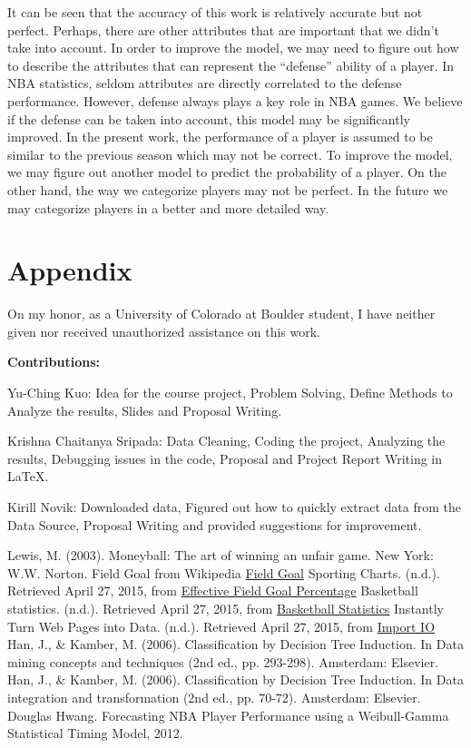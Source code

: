 \documentclass{acm_proc_article-sp}
\begin{document}
It can be seen that the accuracy of this work is relatively accurate but not perfect. Perhaps, there are other attributes that are important that we didn't take into account. In order to improve the model, we may need to figure out how to describe the attributes that can represent the ``defense'' ability of a player. In NBA statistics, seldom attributes are directly correlated to the defense performance. However, defense always plays a key role in NBA games. We believe if the defense can be taken into account, this model may be significantly improved.
In the present work, the performance of a player is assumed to be similar to the previous season which may not be correct. To improve the model, we may figure out another model to predict the probability of a player. On the other hand, the way we categorize players may not be perfect. In the future we may categorize players in a better and more detailed way. 

\section{Appendix}
\vspace{0.5em}
On my honor, as a University of Colorado at Boulder student, I have neither given nor received unauthorized assistance on this work.

\textbf{Contributions:}

Yu-Ching Kuo: Idea for the course project, Problem Solving, Define Methods to Analyze the results, Slides and Proposal Writing.

Krishna Chaitanya Sripada: Data Cleaning, Coding the project, Analyzing the results, Debugging issues in the code, Proposal and Project Report Writing in LaTeX.

Kirill Novik: Downloaded data, Figured out how to quickly extract data from the Data Source, Proposal Writing and provided suggestions for improvement.

\begin{thebibliography}{}
\vspace{0.5em}
Lewis, M. (2003). Moneyball: The art of winning an unfair game. New York: W.W. Norton.
 Field Goal from Wikipedia \href{http://en.wikipedia.org/wiki/Field_goal}{Field Goal}
 Sporting Charts. (n.d.). Retrieved April 27, 2015, from \href{http://www.sportingcharts.com/dictionary/nba/effective-field-goal-percentage-efg.aspx}{Effective Field Goal Percentage}
 Basketball statistics. (n.d.). Retrieved April 27, 2015, from \href{http://en.wikipedia.org/wiki/Basketball_statistics}{Basketball Statistics}
 Instantly Turn Web Pages into Data. (n.d.). Retrieved April 27, 2015, from \href{https://import.io/}{Import IO}
 Han, J., \& Kamber, M. (2006). Classification by Decision Tree Induction. In Data mining concepts and techniques (2nd ed., pp. 293-298). Amsterdam: Elsevier.
 Han, J., \& Kamber, M. (2006). Classification by Decision Tree Induction. In Data integration and transformation (2nd ed., pp. 70-72). Amsterdam: Elsevier.
\setlength{\itemindent}{0.13in}
 Douglas Hwang. Forecasting NBA Player Performance using a Weibull-Gamma Statistical Timing Model, 2012.
\end{thebibliography}
\end{document}
